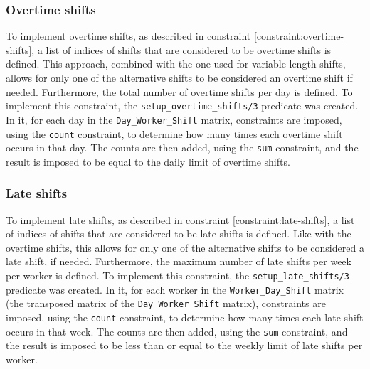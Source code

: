 \documentclass[conference]{IEEEtran}
\def\constraint#1{\vspace{4pt} {#1}}
\begin{document}
\constraint {
    \subsubsection*{Overtime shifts}
    To implement overtime shifts, as described in constraint \ref{constraint:overtime-shifts}, a list of indices of shifts that are considered to be overtime shifts is defined. This approach, combined with the one used for variable-length shifts, allows for only one of the alternative shifts to be considered an overtime shift if needed. Furthermore, the total number of overtime shifts per day is defined.
    To implement this constraint, the \texttt{setup\_overtime\_shifts/3} predicate was created. In it, for each day in the \texttt{Day\_Worker\_Shift} matrix, constraints are imposed, using the \texttt{count} constraint, to determine how many times each overtime shift occurs in that day. The counts are then added, using the \texttt{sum} constraint, and the result is imposed to be equal to the daily limit of overtime shifts.
}

\constraint {
    \subsubsection*{Late shifts}
    To implement late shifts, as described in constraint \ref{constraint:late-shifts}, a list of indices of shifts that are considered to be late shifts is defined. Like with the overtime shifts, this allows for only one of the alternative shifts to be considered a late shift, if needed. Furthermore, the maximum number of late shifts per week per worker is defined.
    To implement this constraint, the \texttt{setup\_late\_shifts/3} predicate was created. In it, for each worker in the \texttt{Worker\_Day\_Shift} matrix (the transposed matrix of the \texttt{Day\_Worker\_Shift} matrix), constraints are imposed, using the \texttt{count} constraint, to determine how many times each late shift occurs in that week. The counts are then added, using the \texttt{sum} constraint, and the result is imposed to be less than or equal to the weekly limit of late shifts per worker.
}
\end{document}
